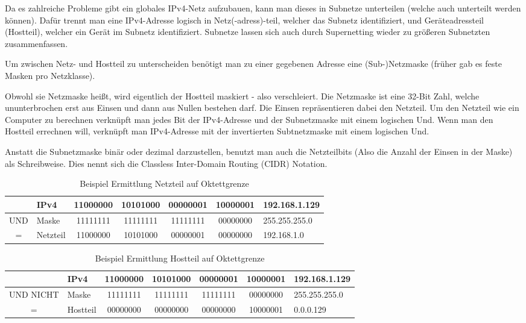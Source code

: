 Da es zahlreiche Probleme gibt ein globales IPv4-Netz aufzubauen, kann man dieses in Subnetze unterteilen (welche auch unterteilt werden können). Dafür trennt man eine IPv4-Adresse logisch in Netz(-adress)-teil, welcher das Subnetz identifiziert, und Geräteadressteil (Hostteil), welcher ein Gerät im Subnetz identifiziert. Subnetze lassen sich auch durch Supernetting wieder zu größeren Subnetzten zusammenfassen.

Um zwischen Netz- und Hostteil zu unterscheiden benötigt man zu einer gegebenen Adresse eine (Sub-)Netzmaske (früher gab es feste Masken pro Netzklasse).

Obwohl sie Netzmaske heißt, wird eigentlich der Hostteil maskiert - also verschleiert. Die Netzmaske ist eine 32-Bit Zahl, welche ununterbrochen erst aus Einsen und dann aus Nullen bestehen darf. Die Einsen repräsentieren dabei den Netzteil. Um den Netzteil wie ein Computer zu berechnen verknüpft man jedes Bit der IPv4-Adresse und der Subnetzmaske mit einem logischen Und. Wenn man den Hostteil errechnen will, verknüpft man IPv4-Adresse mit der invertierten Subtnetzmaske mit einem logischen Und.

Anstatt die Subnetzmaske binär oder dezimal darzustellen, benutzt man auch die Netzteilbits (Also die Anzahl der Einsen in der Maske) als Schreibweise. Dies nennt sich die Classless Inter-Domain Routing (CIDR) Notation.

\begin{table}
    [H]
    \centering
    \begin{tabular}{|c|l|cccc|l|}
        \hline
            & IPv4     & 11000000 & 10101000 & 00000001 & 10000001 & 192.168.1.129 \\\hline
        UND & Maske    & 11111111 & 11111111 & 11111111 & 00000000 & 255.255.255.0 \\\hline
        =   & Netzteil & 11000000 & 10101000 & 00000001 & 00000000 & 192.168.1.0   \\\hline
    \end{tabular}
    \caption{Beispiel Ermittlung Netzteil auf Oktettgrenze}
    \label{tab:lf9:bsp:ErmittlungNetzteil}
\end{table}

\begin{table}
    [H]
    \centering
    \begin{tabular}{|c|l|cccc|l|}
        \hline
                  & IPv4     & 11000000 & 10101000 & 00000001 & 10000001 & 192.168.1.129 \\\hline
        UND NICHT & Maske    & 11111111 & 11111111 & 11111111 & 00000000 & 255.255.255.0 \\\hline
        =         & Hostteil & 00000000 & 00000000 & 00000000 & 10000001 & 0.0.0.129     \\\hline
    \end{tabular}
    \caption{Beispiel Ermittlung Hostteil auf Oktettgrenze}
\end{table}

